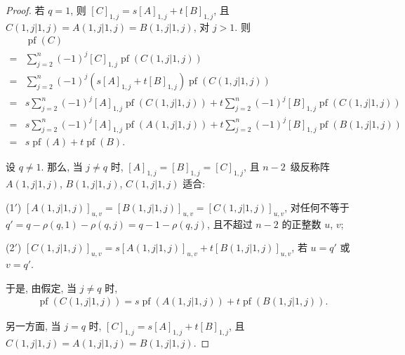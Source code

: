 \documentclass[../libro.tex]{subfiles}
\begin{document}
\begin{proof}
    若 \(q = 1\), 则
    \([C]_{1,j} = s[A]_{1,j} + t[B]_{1,j}\),
    且 \(C({1,j}|{1,j}) = A({1,j}|{1,j}) = B({1,j}|{1,j})\),
    对 \(j > 1\).
    则
    \begin{align*}
        &
        \operatorname{pf} {(C)}
        \\
        = {} &
        \sum_{j=2}^{n}
        {(-1)^j [C]_{1,j}
        \operatorname{pf} {(C({1,j}|{1,j}))}}
        \\
        = {} &
        \sum_{j=2}^{n}
        {(-1)^j (s[A]_{1,j} + t[B]_{1,j})
        \operatorname{pf} {(C({1,j}|{1,j}))}}
        \\
        = {} &
        s \sum_{j=2}^{n}
        {(-1)^j [A]_{1,j}
        \operatorname{pf} {(C({1,j}|{1,j}))}}
        +
        t \sum_{j=2}^{n}
        {(-1)^j [B]_{1,j}
        \operatorname{pf} {(C({1,j}|{1,j}))}}
        \\
        = {} &
        s \sum_{j=2}^{n}
        {(-1)^j [A]_{1,j}
        \operatorname{pf} {(A({1,j}|{1,j}))}}
        +
        t \sum_{j=2}^{n}
        {(-1)^j [B]_{1,j}
        \operatorname{pf} {(B({1,j}|{1,j}))}}
        \\
        = {} &
        s \operatorname{pf} {(A)}
        + t \operatorname{pf} {(B)}.
    \end{align*}

    设 \(q \neq 1\).
    那么, 当 \(j \neq q\) 时,
    \([A]_{1,j} = [B]_{1,j} = [C]_{1,j}\),
    且 \(n-2\)~级反称阵
    \(A({1,j}|{1,j})\),
    \(B({1,j}|{1,j})\),
    \(C({1,j}|{1,j})\)
    适合:

    (1\('\))
    \([A({1,j}|{1,j})]_{u,v}
        = [B({1,j}|{1,j})]_{u,v}
    = [C({1,j}|{1,j})]_{u,v}\),
    对任何不等于 \(q' = q - \rho(q, 1) - \rho(q, j)
    = q - 1 - \rho(q, j)\),
    且不超过 \(n-2\) 的正整数 \(u\), \(v\);

    (2\('\))
    \([C({1,j}|{1,j})]_{u,v}
        = s [A({1,j}|{1,j})]_{u,v}
    + t [B({1,j}|{1,j})]_{u,v}\),
    若 \(u = q'\) 或 \(v = q'\).

    于是, 由假定, 当 \(j \neq q\) 时,
    \begin{align*}
        \operatorname{pf} {(C({1,j}|{1,j}))}
        = s \operatorname{pf} {(A({1,j}|{1,j}))}
        + t \operatorname{pf} {(B({1,j}|{1,j}))}.
    \end{align*}

    另一方面, 当 \(j = q\) 时,
    \([C]_{1,j} = s[A]_{1,j} + t[B]_{1,j}\),
    且 \(C({1,j}|{1,j}) = A({1,j}|{1,j}) = B({1,j}|{1,j})\).


\end{proof}
\end{document}

